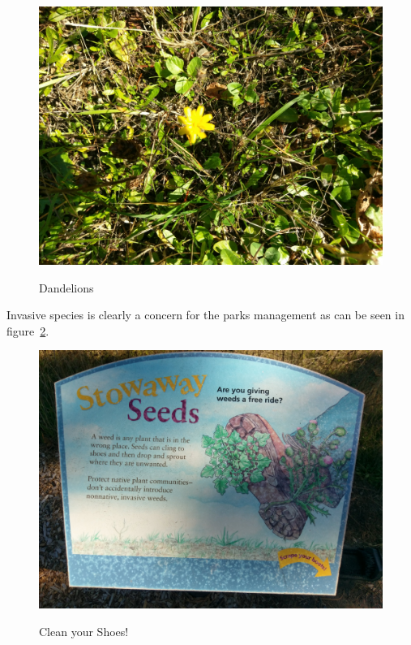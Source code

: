 \documentclass{article}
\begin{document}
\begin{figure}[H]
\centering{}
\caption{Dandelions}
\includegraphics[scale=0.05]{dandelions.jpg}
\label{dandy}
\end{figure}

Invasive species is clearly a concern for the parks management as can be seen in figure~\ref{shoes}.
\begin{figure}[H]
\centering{}
\caption{Clean your Shoes!}
\includegraphics[scale=0.07]{stowaway_seeds_sign.jpg}
\label{shoes}
\end{figure}
\newpage
\end{document}
